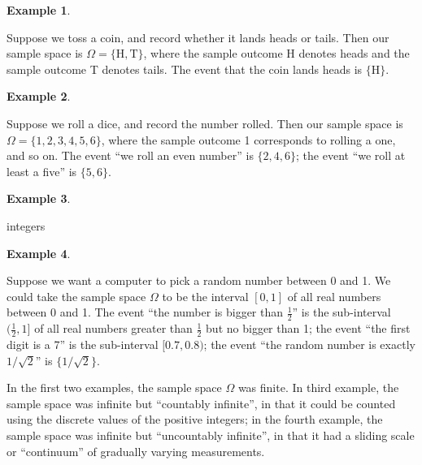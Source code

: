 \documentclass[
  a4paper,
]{book}
\theoremstyle{definition}
\theoremstyle{definition}
\newtheorem{example}{Example}[chapter]
\theoremstyle{definition}
\theoremstyle{remark}
\begin{document}
\begin{example}
\protect\hypertarget{exm:unlabeled-div-4}{}\label{exm:unlabeled-div-4}

Suppose we toss a coin, and record whether it lands heads or tails. Then our sample space is \(\Omega = \{\mathrm H, \mathrm T\}\), where the sample outcome H denotes heads and the sample outcome T denotes tails. The event that the coin lands heads is \(\{\mathrm H\}\).

\end{example}

\begin{example}
\protect\hypertarget{exm:unlabeled-div-5}{}\label{exm:unlabeled-div-5}

Suppose we roll a dice, and record the number rolled. Then our sample space is \(\Omega = \{1,2,3,4,5,6\}\), where the sample outcome 1 corresponds to rolling a one, and so on. The event ``we roll an even number'' is \(\{2,4,6\}\); the event ``we roll at least a five'' is \(\{5,6\}\).

\end{example}

\begin{example}
\protect\hypertarget{exm:unlabeled-div-6}{}\label{exm:unlabeled-div-6}

integers

\end{example}

\begin{example}
\protect\hypertarget{exm:unlabeled-div-7}{}\label{exm:unlabeled-div-7}

Suppose we want a computer to pick a random number between 0 and 1. We could take the sample space \(\Omega\) to be the interval \([0, 1]\) of all real numbers between 0 and 1. The event ``the number is bigger than \(\frac12\)'' is the sub-interval \((\frac12, 1]\) of all real numbers greater than \(\frac12\) but no bigger than 1; the event ``the first digit is a 7'' is the sub-interval \([0.7, 0.8)\); the event ``the random number is exactly \(1/\sqrt{2}\)'' is \(\{1/\sqrt{2}\}\).

\end{example}

In the first two examples, the sample space \(\Omega\) was finite. In third example, the sample space was infinite but ``countably infinite'', in that it could be counted using the discrete values of the positive integers; in the fourth example, the sample space was infinite but ``uncountably infinite'', in that it had a sliding scale or ``continuum'' of gradually varying measurements.
\end{document}
